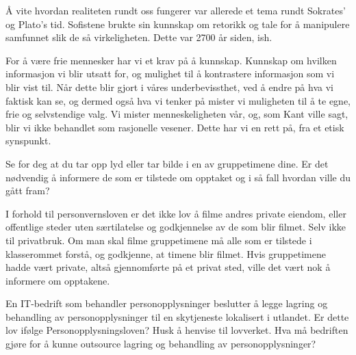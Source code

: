 \documentclass{../../myassignment}
\begin{document}
	\begin{answer}
		Å vite hvordan realiteten rundt oss fungerer var allerede et tema rundt Sokrates' og Plato's tid. Sofistene brukte sin kunnskap om retorikk og tale for å manipulere samfunnet slik de så virkeligheten. Dette var 2700 år siden, ish. 

		For å være frie mennesker har vi et krav på å kunnskap. Kunnskap om hvilken informasjon vi blir utsatt for, og mulighet til å kontrastere informasjon som vi blir vist til. Når dette blir gjort i våres underbevissthet, ved å endre på hva vi faktisk kan se, og dermed også hva vi tenker på mister vi muligheten til å te egne, frie og selvstendige valg. Vi mister menneskeligheten vår, og, som Kant ville sagt, blir vi ikke behandlet som rasjonelle vesener. Dette har vi en rett på, fra et etisk synspunkt.

	\end{answer}

	\begin{problem}
		Se for deg at du tar opp lyd eller tar bilde i en av gruppetimene dine. Er det nødvendig å informere de som er tilstede om opptaket og i så fall hvordan ville du gått fram?
	\end{problem}

	\begin{answer}
		I forhold til personvernsloven er det ikke lov å filme andres private eiendom, eller offentlige steder uten særtilatelse og godkjennelse av de som blir filmet. Selv ikke til privatbruk. Om man skal filme gruppetimene må alle som er tilstede i klasserommet forstå, og godkjenne, at timene blir filmet. Hvis gruppetimene hadde vært private, altså gjennomførte på et privat sted, ville det vært nok å informere om opptakene. 

	\end{answer}


	\begin{problem}
		En IT-bedrift som behandler personopplysninger beslutter å legge lagring og behandling av personopplysninger til en skytjeneste lokalisert i utlandet. Er dette lov ifølge Personopplysningsloven? Husk å henvise til lovverket. Hva må bedriften gjøre for å kunne outsource lagring og behandling av personopplysninger?
	\end{problem}
\end{document}

